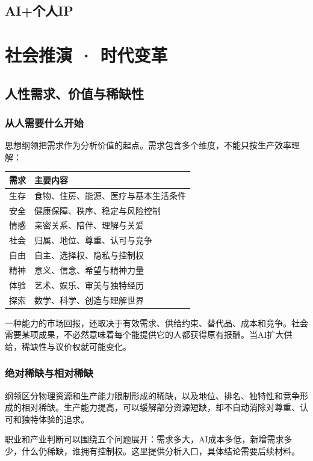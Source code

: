 \documentclass[UTF8,zihao=-4,fontset=fandol,oneside,openany]{ctexbook}
\begin{document}
\section{AI+个人IP}

\chapter{社会推演 · 时代变革}
\section{人性需求、价值与稀缺性}
\subsection*{从人需要什么开始}
思想纲领把需求作为分析价值的起点\cite{principles}。需求包含多个维度，不能只按生产效率理解：
\begin{center}\small
\begin{tabularx}{\textwidth}{P{0.18\textwidth}Y}
\toprule 需求 & 主要内容\\\midrule
生存 & 食物、住房、能源、医疗与基本生活条件\\
安全 & 健康保障、秩序、稳定与风险控制\\
情感 & 亲密关系、陪伴、理解与关爱\\
社会 & 归属、地位、尊重、认可与竞争\\
自由 & 自主、选择权、隐私与控制权\\
精神 & 意义、信念、希望与精神力量\\
体验 & 艺术、娱乐、审美与独特经历\\
探索 & 数学、科学、创造与理解世界\\
\bottomrule
\end{tabularx}
\end{center}

一种能力的市场回报，还取决于有效需求、供给约束、替代品、成本和竞争。社会需要某项成果，不必然意味着每个能提供它的人都获得原有报酬。当AI扩大供给，稀缺性与议价权就可能变化。

\subsection*{绝对稀缺与相对稀缺}
纲领区分物理资源和生产能力限制形成的稀缺，以及地位、排名、独特性和竞争形成的相对稀缺。生产能力提高，可以缓解部分资源短缺，却不自动消除对尊重、认可和独特体验的追求。

职业和产业判断可以围绕五个问题展开：需求多大，AI成本多低，新增需求多少，什么仍稀缺，谁拥有控制权。这里提供分析入口，具体结论需要后续材料。
\end{document}
